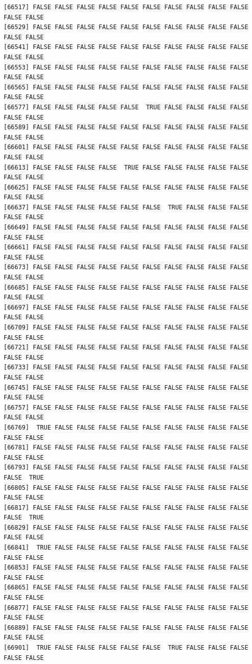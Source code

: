 \documentclass[
  a4paper,
  DIV=11,
  numbers=noendperiod]{scrartcl}
\begin{document}
\begin{verbatim}
[66517] FALSE FALSE FALSE FALSE FALSE FALSE FALSE FALSE FALSE FALSE FALSE FALSE
[66529] FALSE FALSE FALSE FALSE FALSE FALSE FALSE FALSE FALSE FALSE FALSE FALSE
[66541] FALSE FALSE FALSE FALSE FALSE FALSE FALSE FALSE FALSE FALSE FALSE FALSE
[66553] FALSE FALSE FALSE FALSE FALSE FALSE FALSE FALSE FALSE FALSE FALSE FALSE
[66565] FALSE FALSE FALSE FALSE FALSE FALSE FALSE FALSE FALSE FALSE FALSE FALSE
[66577] FALSE FALSE FALSE FALSE FALSE  TRUE FALSE FALSE FALSE FALSE FALSE FALSE
[66589] FALSE FALSE FALSE FALSE FALSE FALSE FALSE FALSE FALSE FALSE FALSE FALSE
[66601] FALSE FALSE FALSE FALSE FALSE FALSE FALSE FALSE FALSE FALSE FALSE FALSE
[66613] FALSE FALSE FALSE FALSE  TRUE FALSE FALSE FALSE FALSE FALSE FALSE FALSE
[66625] FALSE FALSE FALSE FALSE FALSE FALSE FALSE FALSE FALSE FALSE FALSE FALSE
[66637] FALSE FALSE FALSE FALSE FALSE FALSE  TRUE FALSE FALSE FALSE FALSE FALSE
[66649] FALSE FALSE FALSE FALSE FALSE FALSE FALSE FALSE FALSE FALSE FALSE FALSE
[66661] FALSE FALSE FALSE FALSE FALSE FALSE FALSE FALSE FALSE FALSE FALSE FALSE
[66673] FALSE FALSE FALSE FALSE FALSE FALSE FALSE FALSE FALSE FALSE FALSE FALSE
[66685] FALSE FALSE FALSE FALSE FALSE FALSE FALSE FALSE FALSE FALSE FALSE FALSE
[66697] FALSE FALSE FALSE FALSE FALSE FALSE FALSE FALSE FALSE FALSE FALSE FALSE
[66709] FALSE FALSE FALSE FALSE FALSE FALSE FALSE FALSE FALSE FALSE FALSE FALSE
[66721] FALSE FALSE FALSE FALSE FALSE FALSE FALSE FALSE FALSE FALSE FALSE FALSE
[66733] FALSE FALSE FALSE FALSE FALSE FALSE FALSE FALSE FALSE FALSE FALSE FALSE
[66745] FALSE FALSE FALSE FALSE FALSE FALSE FALSE FALSE FALSE FALSE FALSE FALSE
[66757] FALSE FALSE FALSE FALSE FALSE FALSE FALSE FALSE FALSE FALSE FALSE FALSE
[66769]  TRUE FALSE FALSE FALSE FALSE FALSE FALSE FALSE FALSE FALSE FALSE FALSE
[66781] FALSE FALSE FALSE FALSE FALSE FALSE FALSE FALSE FALSE FALSE FALSE FALSE
[66793] FALSE FALSE FALSE FALSE FALSE FALSE FALSE FALSE FALSE FALSE FALSE  TRUE
[66805] FALSE FALSE FALSE FALSE FALSE FALSE FALSE FALSE FALSE FALSE FALSE FALSE
[66817] FALSE FALSE FALSE FALSE FALSE FALSE FALSE FALSE FALSE FALSE FALSE  TRUE
[66829] FALSE FALSE FALSE FALSE FALSE FALSE FALSE FALSE FALSE FALSE FALSE FALSE
[66841]  TRUE FALSE FALSE FALSE FALSE FALSE FALSE FALSE FALSE FALSE FALSE FALSE
[66853] FALSE FALSE FALSE FALSE FALSE FALSE FALSE FALSE FALSE FALSE FALSE FALSE
[66865] FALSE FALSE FALSE FALSE FALSE FALSE FALSE FALSE FALSE FALSE FALSE FALSE
[66877] FALSE FALSE FALSE FALSE FALSE FALSE FALSE FALSE FALSE FALSE FALSE FALSE
[66889] FALSE FALSE FALSE FALSE FALSE FALSE FALSE FALSE FALSE FALSE FALSE FALSE
[66901]  TRUE FALSE FALSE FALSE FALSE FALSE  TRUE FALSE FALSE FALSE FALSE FALSE

\end{verbatim}
\end{document}
